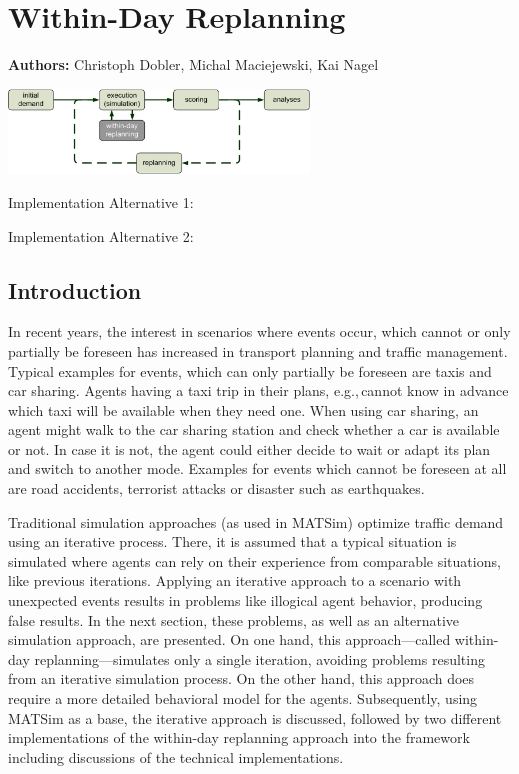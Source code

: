 \chapter{Within-Day Replanning}
\label{ch:withinday}

\hfill \textbf{Authors:} Christoph Dobler, Michal Maciejewski, Kai Nagel

\begin{center} \includegraphics[width=0.6\textwidth, angle=0]{extending/figures/WithinDayReplanning/WithinDayMATSimLoop} \end{center}

Implementation Alternative 1:

Implementation Alternative 2:

\section{Introduction}
In recent years, the interest in scenarios where events occur, which cannot or only partially be foreseen has increased in transport planning and traffic management. Typical examples for events, which can only partially be foreseen are taxis and car sharing. Agents having a taxi trip in their plans, e.g.,\,cannot know in advance which taxi will be available when they need one. When using car sharing, an agent might walk to the car sharing station and check whether a car is available or not. In case it is not, the agent could either decide to wait or adapt its plan and switch to another mode. Examples for events which cannot be foreseen at all are road accidents, terrorist attacks or disaster such as earthquakes.

Traditional simulation approaches (as used in MATSim) optimize traffic demand using an iterative process. There, it is assumed that a typical situation is simulated where agents can rely on their experience from comparable situations, like previous iterations. Applying an iterative approach to a scenario with unexpected events results in problems like illogical agent behavior, producing false results. In the next section, these problems, as well as an alternative simulation approach, are presented. On one hand, this approach---called within-day replanning---simulates only a single iteration, avoiding problems resulting from an iterative simulation process. On the other hand, this approach does require a more detailed behavioral model for the agents. Subsequently, using MATSim as a base, the iterative approach is discussed, followed by two different implementations of the within-day replanning approach into the framework including discussions of the technical implementations.

